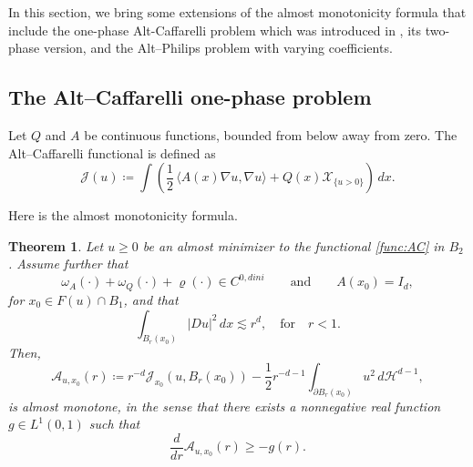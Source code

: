 \documentclass[reqno,11pt]{amsart}
\newtheorem{theorem}{Theorem}[section]
\newcommand{\1}{\mathds{1}}  %
\numberwithin{equation}{section}
\begin{document}
In this section, we bring some extensions of the almost monotonicity formula that include the one-phase Alt-Caffarelli problem which was introduced in \cite{AC}, its two-phase version, and the Alt--Philips problem with varying coefficients.

\subsection{The Alt--Caffarelli one-phase problem}

Let $Q$ and $A$ be continuous functions, bounded from below away from zero. The Alt--Caffarelli functional is defined as
\begin{equation}\label{func:AC}
    \mathcal J(u) \coloneqq \int \left( \frac{1}{2} \, \langle A(x)\nabla u, \nabla u \rangle + Q(x)\mathcal{X}_{\{u>0\}}\right)\,dx.
\end{equation}

Here is the almost monotonicity formula.

\begin{theorem}\label{thm : almost mon formula}
Let $u \geq 0$ be an almost minimizer to the functional \eqref{func:AC} in $B_2$. Assume further that
\[
	\omega_A(\cdot) + \omega_Q(\cdot) + \varrho(\cdot) \in C^{0,dini} \qquad \text{and} \qquad A(x_0) = I_d,
\]
for $x_0 \in F(u)\cap B_1$, and that
\[
	\int_{B_r(x_0)} |Du|^2\,dx \lesssim r^d, \quad \text{for} \quad r<1.
\]  
Then,
\[
    \mathcal{A}_{u,x_0}(r) \coloneqq r^{-d}\mathcal{J}_{x_0}(u,B_r(x_0)) - \frac{1}{2}r^{-d - 1}\int_{\partial B_r(x_0)}u^2\, d\mathcal{H}^{d-1},
\]
is almost monotone, in the sense that there exists a nonnegative real function $g \in L^1(0,1)$ such that
$$
	\frac{d}{dr} \mathcal{A}_{u,x_0}(r) \geq -g(r).
$$
\end{theorem}
\end{document}
